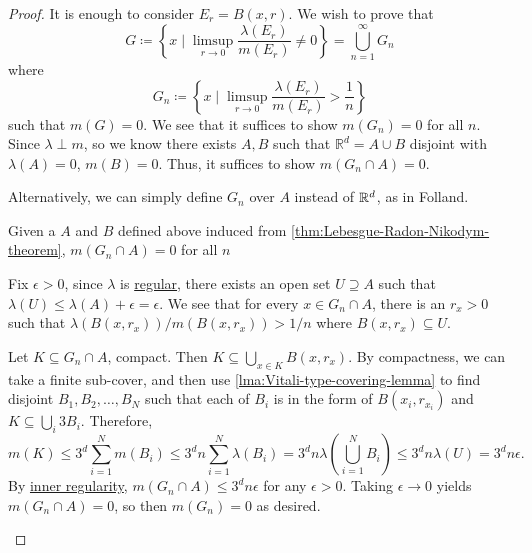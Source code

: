 \begin{proof}
	It is enough to consider \(E_r = B(x,r)\). We wish to prove that
	\[
		G \coloneqq \left\{x \mid \limsup_{r \to 0} \frac{\lambda(E_r)}{m(E_r)} \neq 0\right\}  = \bigcup_{n = 1}^\infty G_n
	\]
	where
	\[
		G_n \coloneqq \left\{x \mid \limsup_{r \to 0} \frac{\lambda(E_r)}{m(E_r)} > \frac{1}{n}\right\}
	\]
	such that \(m(G) = 0\). We see that it suffices to show \(m(G_n) = 0\) for all \(n\). Since \(\lambda \perp m\), so we know there exists \(A, B\) such that
	\(\mathbb{R}^d = A \cup B\) disjoint with \(\lambda(A) = 0\), \(m(B) = 0\). Thus, it suffices to show \(m(G_n \cap A) = 0\).
	\begin{note}
		Alternatively, we can simply define \(G_{n} \) over \(A\) instead of \(\mathbb{\MakeUppercase{r}} ^d\), as in Folland\cite{folland1999real}.
	\end{note}

	\begin{claim}
		Given a \(A\) and \(B\) defined above induced from \autoref{thm:Lebesgue-Radon-Nikodym-theorem}, \(m(G_n \cap A) = 0\) for all \(n\)
	\end{claim}
	\begin{explanation}
		Fix \(\epsilon> 0\), since \(\lambda\) is \hyperref[def:regular]{regular}, there exists an open set \(U \supseteq A\) such that \(\lambda(U) \leq \lambda(A) + \epsilon= \epsilon \).
		We see that for every \(x \in G_n \cap A\), there is an \(r_x > 0\) such that \(\lambda(B(x,r_x))/m(B(x,r_x)) > 1/n\) where \(B(x,r_x) \subseteq U\).

		Let \(K \subseteq G_n \cap A\), compact. Then \(K \subseteq \bigcup_{x \in K} B(x,r_x)\). By compactness, we can take a finite sub-cover, and then use
		\autoref{lma:Vitali-type-covering-lemma} to find  disjoint \(B_1,B_2,\ldots,B_N\) such that each of \(B_{i} \) is in the form of \(B(x_i,r_{x_i})\) and
		\(K \subseteq \bigcup_i 3B_i\). Therefore,
		\[
			m(K) \leq 3^d \sum_{i=1}^N m(B_i) \leq 3^dn\sum_{i=1}^N \lambda(B_i) = 3^d n\lambda\left( \bigcup_{i=1}^N B_i \right) \leq 3^dn\lambda(U) = 3^dn \epsilon .
		\]
		By \hyperref[thm:inner-regularity]{inner regularity}, \(m(G_n \cap A) \leq 3^d n\epsilon\) for any \(\epsilon> 0\). Taking \(\epsilon\to 0\) yields \(m(G_n \cap A) = 0\), so then \(m(G_n) = 0\) as desired.
	\end{explanation}
\end{proof}
